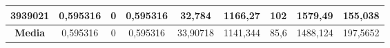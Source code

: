 \documentclass[12pt, spanish]{article}
\begin{document}
\begin{table}[H]
\begin{tabular}{|c|c|c|c|c|c|c|c|c|}
3939021           & 0,595316                  & 0                           & 0,595316               & 32,784     & 1166,27                   & 102                         & 1579,49                & 155,038    \\ \hline
\textbf{Media}    & 0,595316                  & 0                           & 0,595316               & 33,90718   & 1141,344                  & 85,6                        & 1488,124               & 197,5652   \\ \hline
\end{tabular}
\end{table}

\begin{table}[H]
\footnotesize


\end{table}
\end{document}
